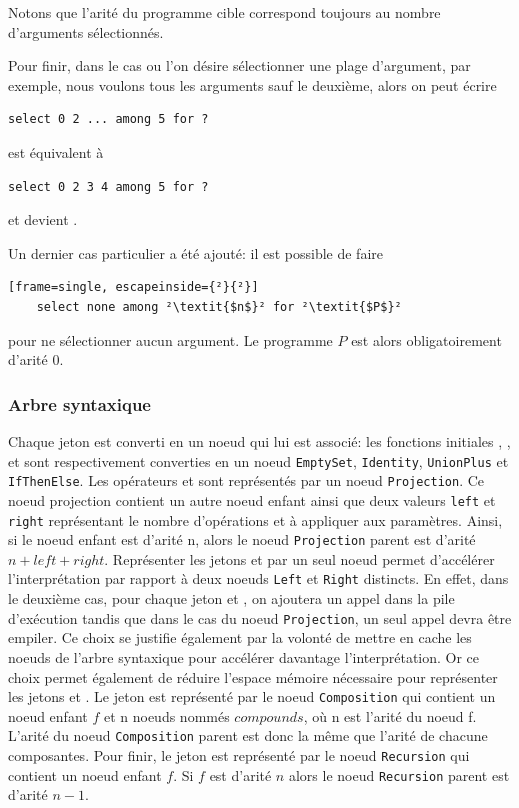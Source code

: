 \documentclass[a4paper, 11pt]{article}
\begin{document}
Notons que l'arité du programme cible correspond toujours au nombre d'arguments sélectionnés.

Pour finir, dans le cas ou l'on désire sélectionner une plage d'argument, par exemple, nous voulons
tous les arguments sauf le deuxième, alors on peut écrire 
\begin{lstlisting}[frame=single]
    select 0 2 ... among 5 for ?
\end{lstlisting}
est équivalent à 
\begin{lstlisting}[frame=single]
    select 0 2 3 4 among 5 for ?
\end{lstlisting}
et devient .


Un dernier cas particulier a été ajouté: il est possible de faire 

\begin{lstlisting}[frame=single, escapeinside={²}{²}]
    select none among ²\textit{$n$}² for ²\textit{$P$}²
\end{lstlisting}

pour ne sélectionner aucun argument. Le programme \textit{$P$} est alors obligatoirement d'arité 0.

\subsubsection{Arbre syntaxique \label{arbre syntaxique}}

Chaque jeton est converti en un noeud qui lui est associé: les fonctions initiales
, , \progS{+} et  sont respectivement converties en
un noeud \lstinline{EmptySet}, \lstinline{Identity}, \lstinline{UnionPlus} et 
\lstinline{IfThenElse}. Les opérateurs \progS{<} et \progS{>} sont représentés 
par un noeud \lstinline{Projection}. Ce noeud projection contient un autre noeud
enfant ainsi que deux valeurs \lstinline{left} et \lstinline{right} représentant
le nombre d'opérations \progS{<} et \progS{>} à appliquer aux paramètres.
Ainsi, si le noeud enfant est d'arité n, alors le noeud \lstinline{Projection}
parent est d'arité $n + left + right$. Représenter les jetons \progS{<} et \progS{>}
par un seul noeud permet d'accélérer l'interprétation par rapport à deux noeuds 
\lstinline{Left} et \lstinline{Right} distincts. En effet, dans le deuxième cas,
pour chaque jeton \progS{<} et \progS{>}, on ajoutera un appel dans
la pile d'exécution tandis que dans le cas du noeud \lstinline{Projection}, un seul 
appel devra être empiler. Ce choix se justifie également par la volonté de mettre
en cache les noeuds de l'arbre syntaxique pour accélérer davantage l'interprétation.
Or ce choix permet également de réduire l'espace mémoire nécessaire pour représenter
les jetons \progS{<} et \progS{>}. 
Le jeton  est représenté par le noeud \lstinline{Composition} qui contient
un noeud enfant $f$ et n noeuds nommés $compounds$, où n est l'arité du noeud f. L'arité du
noeud \lstinline{Composition} parent est donc la même que l'arité de chacune composantes.
Pour finir, le jeton  est représenté par le noeud \lstinline{Recursion}
qui contient un noeud enfant $f$. Si $f$ est d'arité $n$ alors le noeud
\lstinline{Recursion} parent est d'arité $n-1$. 
\end{document}

